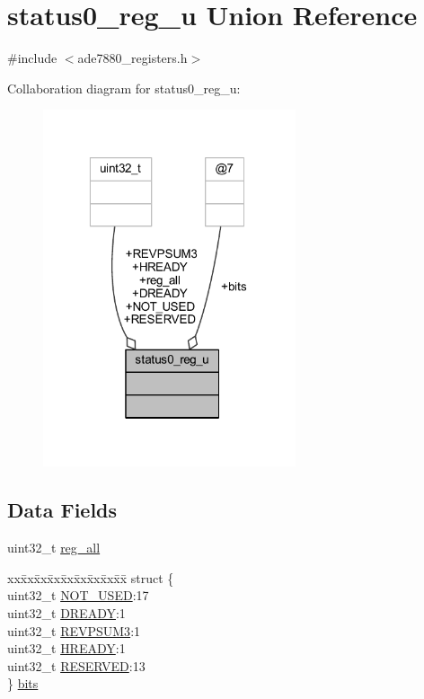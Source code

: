 \hypertarget{a00032}{\section{status0\-\_\-reg\-\_\-u Union Reference}
\label{dc/d87/a00032}
}


{\ttfamily \#include $<$ade7880\-\_\-registers.\-h$>$}



Collaboration diagram for status0\-\_\-reg\-\_\-u\-:\nopagebreak
\begin{figure}[H]
\begin{center}
\leavevmode
\includegraphics[width=211pt]{d1/d44/a00098}
\end{center}
\end{figure}
\subsection*{Data Fields}
\begin{DoxyCompactItemize}
\item 
uint32\-\_\-t \hyperlink{a00032_ae44a0232a79ff51b5ef7aa80e4b35470}{reg\-\_\-all}
\item 
\begin{tabbing}
xx\=xx\=xx\=xx\=xx\=xx\=xx\=xx\=xx\=\kill
struct \{\\
\>uint32\_t \hyperlink{a00032_aa979856ee90a694e453f80dde4e52bc7}{NOT\_USED}:17\\
\>uint32\_t \hyperlink{a00032_addffbfdbfb43bcbc4893718495e12d8b}{DREADY}:1\\
\>uint32\_t \hyperlink{a00032_a07697224a4919cedc8988eb9013c6d5b}{REVPSUM3}:1\\
\>uint32\_t \hyperlink{a00032_abe9d0514a4b0619dd17737e16f9018a0}{HREADY}:1\\
\>uint32\_t \hyperlink{a00032_a0e5030971ec1bfd3101f83f546493c83}{RESERVED}:13\\
\} \hyperlink{a00032_a16a3d2bba55a06488b87f0c7f9c00887}{bits}\\

\end{tabbing}\end{DoxyCompactItemize}


